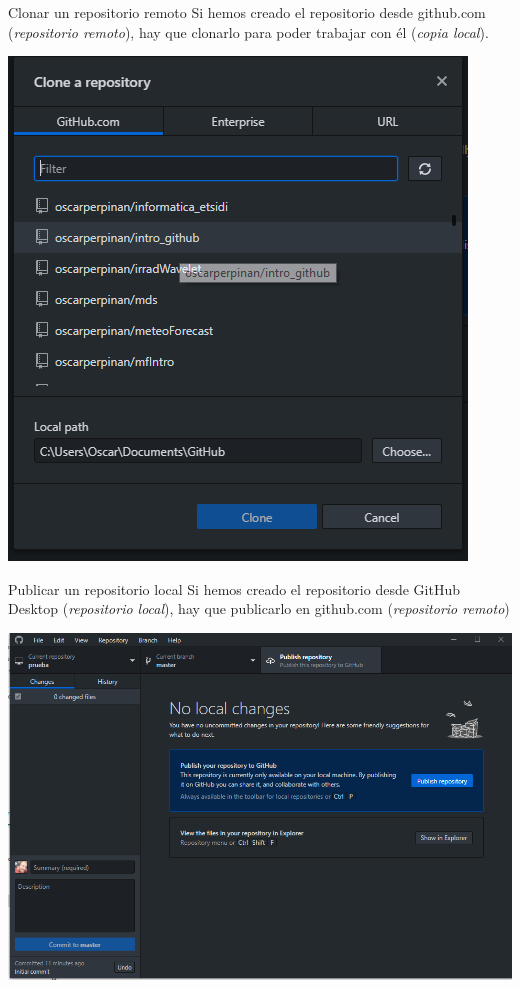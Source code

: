 \documentclass[xcolor={usenames,svgnames,dvipsnames}]{beamer}
\begin{document}
\begin{frame}[label={sec:orgb0ae263}]{Clonar un repositorio remoto}
Si hemos creado el repositorio desde github.com (\emph{repositorio remoto}), hay que clonarlo para poder trabajar con él (\emph{copia local}).

\begin{center}
\end{center}

\begin{center}
\includegraphics[height=0.65\textheight]{figs/Desktop_CloneRepository.png}
\end{center}
\end{frame}

\begin{frame}[label={sec:orgd666338}]{Publicar un repositorio local}
Si hemos creado el repositorio desde GitHub Desktop (\emph{repositorio local}), hay que publicarlo en github.com (\emph{repositorio remoto})

\begin{center}
\includegraphics[width=.9\linewidth]{figs/Desktop_PublishRepository.png}
\end{center}
\end{frame}
\end{document}
